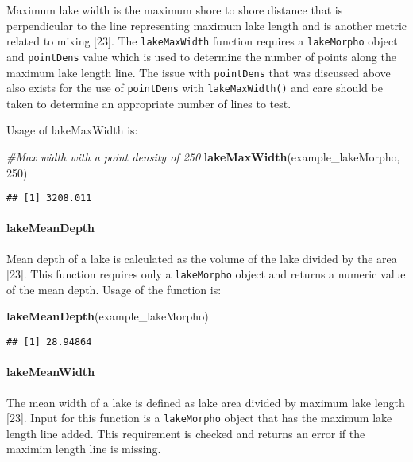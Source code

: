 \documentclass[11pt,]{article}
\newenvironment{Shaded}{\begin{snugshade}}{\end{snugshade}}
\newcommand{\KeywordTok}[1]{\textcolor[rgb]{0.13,0.29,0.53}{\textbf{{#1}}}}
\newcommand{\DecValTok}[1]{\textcolor[rgb]{0.00,0.00,0.81}{{#1}}}
\newcommand{\CommentTok}[1]{\textcolor[rgb]{0.56,0.35,0.01}{\textit{{#1}}}}
\newcommand{\NormalTok}[1]{{#1}}
\begin{document}
Maximum lake width is the maximum shore to shore distance that is
perpendicular to the line representing maximum lake length and is
another metric related to mixing {[}23{]}. The \texttt{lakeMaxWidth}
function requires a \texttt{lakeMorpho} object and \texttt{pointDens}
value which is used to determine the number of points along the maximum
lake length line. The issue with \texttt{pointDens} that was discussed
above also exists for the use of \texttt{pointDens} with
\texttt{lakeMaxWidth()} and care should be taken to determine an
appropriate number of lines to test.

Usage of lakeMaxWidth is:

\begin{Shaded}
\begin{Highlighting}[]
\CommentTok{#Max width with a point density of 250}
\KeywordTok{lakeMaxWidth}\NormalTok{(example_lakeMorpho, }\DecValTok{250}\NormalTok{)}
\end{Highlighting}
\end{Shaded}

\begin{verbatim}
## [1] 3208.011
\end{verbatim}

\paragraph{lakeMeanDepth}\label{lakemeandepth}

Mean depth of a lake is calculated as the volume of the lake divided by
the area {[}23{]}. This function requires only a \texttt{lakeMorpho}
object and returns a numeric value of the mean depth. Usage of the
function is:

\begin{Shaded}
\begin{Highlighting}[]
\KeywordTok{lakeMeanDepth}\NormalTok{(example_lakeMorpho)}
\end{Highlighting}
\end{Shaded}

\begin{verbatim}
## [1] 28.94864
\end{verbatim}

\paragraph{lakeMeanWidth}\label{lakemeanwidth}

The mean width of a lake is defined as lake area divided by maximum lake
length {[}23{]}. Input for this function is a \texttt{lakeMorpho} object
that has the maximum lake length line added. This requirement is checked
and returns an error if the maximim length line is missing.
\end{document}
